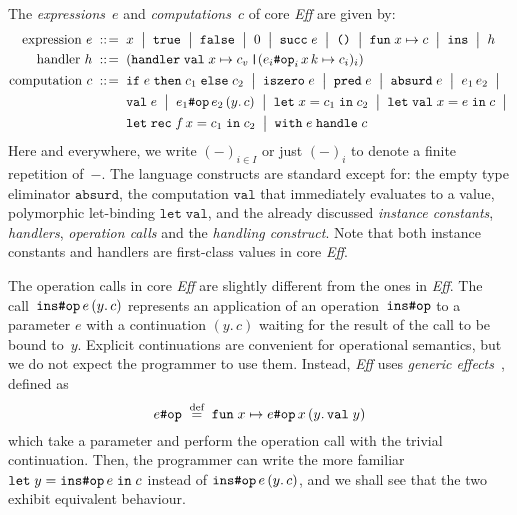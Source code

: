 \documentclass{LMCS}
\newcommand{\bnfis}{\mathrel{\;{:}{:}\!=}\;}
\newcommand{\bnfor}{\mathrel{\;\big|\;}}
\newcommand{\defeq}{\mathrel{\;\stackrel{\text{def}}{=}\;}}
\newcommand{\kord}[1]{\mathtt{#1}}
\newcommand{\kop}[1]{\;\mathtt{#1}\;}
\newcommand{\kpre}[1]{\mathtt{#1}\;}
\newcommand{\absurd}{\kpre{absurd}}
\newcommand{\case}{\mathop{\text{\texttt{|}}}}
\newcommand{\cont}[2]{(#1.\,#2)}
\newcommand{\fls}{\kord{false}}
\newcommand{\fun}[1]{\kpre{fun} #1 \mapsto}
\newcommand{\handler}{\kpre{handler}}
\newcommand{\hash}[2]{#1\text{\texttt{\char35}}#2}
\newcommand{\iszero}{\kpre{iszero}}
\newcommand{\letin}[1]{\kpre{let} #1 \kop{in}}
\newcommand{\letrecin}[1]{\kpre{let} \kpre{rec} #1 \kop{in}}
\newcommand{\letvalin}[1]{\kpre{let} \kpre{val} #1 \kop{in}}
\newcommand{\call}[4]{{\hash{#1}{#2}\,{#3}\, #4}}
\newcommand{\op}{\mathtt{op}}
\newcommand{\inst}{\mathtt{ins}}
\newcommand{\pred}{\kpre{pred}}
\newcommand{\tru}{\kord{true}}
\newcommand{\unt}{\kord{\text{\texttt{()}}}}
\newcommand{\val}{\kpre{val}}
\newcommand{\withhandle}[2]{\kpre{with} #1 \kop{handle} #2}
\renewcommand{\ifthenelse}[3]{\kpre{if} #1 \kop{then} #2 \kop{else} #3}
\renewcommand{\succ}{\kpre{succ}}
\newcommand{\Eff}{\emph{Eff}\xspace}
\begin{document}
The \emph{expressions}~$e$ and \emph{computations}~$c$ of core \Eff are given by:
\begin{align*}
  \text{expression}~e \bnfis {}
    &x \bnfor
    \tru \bnfor
    \fls \bnfor
    0 \bnfor
    \succ e \bnfor
    \unt \bnfor
    \fun{x} c \bnfor
    \inst \bnfor
    h
    \\  
  \text{handler}~h \bnfis {}
    &(
      \handler
      \val x \mapsto c_v \case
      (\call{e_i}{\op_i}{x}{k} \mapsto c_i)_i
    )
    \\
  \text{computation}~c \bnfis {}
    &\ifthenelse{e}{c_1}{c_2} \bnfor
    \iszero e \bnfor
    \pred e \bnfor
    \absurd e \bnfor
    e_1 \, e_2 \bnfor \\
    &\val e \bnfor
    \call{e_1}{\op}{e_2}{\cont{y}{c}} \bnfor
    \letin{x = c_1} c_2 \bnfor
    \letvalin{x = e} c \bnfor \\
    &\letrecin{f \, x = c_1} c_2 \bnfor
    \withhandle{e}{c}
\end{align*}
Here and everywhere, we write $(-)_{i \in I}$ or just $(-)_i$ to denote a finite repetition of~$-$.
The language constructs are standard except for:
the empty type eliminator $\kord{absurd}$,
the computation $\kord{val}$ that immediately evaluates to a value,
polymorphic let-binding $\kpre{let} \kord{val}$,
and the already discussed \emph{instance constants}, \emph{handlers}, \emph{operation calls} and the \emph{handling construct}.
Note that both instance constants and handlers are first-class values in core \Eff.

The operation calls in core \Eff are slightly different from the ones in \Eff.
The call~$\call{\inst}{\op}{e}{\cont{y}{c}}$ represents an application
of an operation~$\hash{\inst}{\op}$ to a parameter $e$
with a continuation $\cont{y}{c}$ waiting for the result of the call to be bound to~$y$.
Explicit continuations are convenient for operational semantics,
but we do not expect the programmer to use them.
Instead, \Eff uses \emph{generic effects}~\cite{plotkin2003algebraic}, defined as
\[
  \hash{e}{\op} \defeq \fun{x} \call{e}{\op}{x}{\cont{y}{\val y}}
\]
which take a parameter and perform the operation call with the trivial continuation.
Then, the programmer can write the more familiar $\letin{y = \hash{\inst}{\op} \, e} c$
instead of $\call{\inst}{\op}{e}{\cont{y}{c}}$,
and we shall see that the two exhibit equivalent behaviour.  
\end{document}
